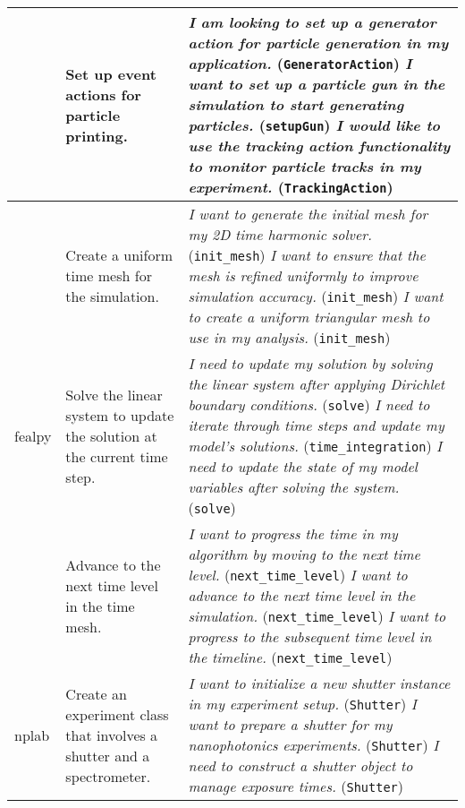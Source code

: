 \begin{longtable}{p{3cm}p{6cm}p{6cm}}
\cmidrule(l){2-3}
& Set up event actions for particle printing. & \textit{I am looking to set up a generator action for particle generation in my application.} (\texttt{GeneratorAction}) \newline \textit{I want to set up a particle gun in the simulation to start generating particles.} (\texttt{setupGun}) \newline \textit{I would like to use the tracking action functionality to monitor particle tracks in my experiment.} (\texttt{TrackingAction}) \\
\midrule
\multirow{3}{*}{fealpy} & Create a uniform time mesh for the simulation. & \textit{I want to generate the initial mesh for my 2D time harmonic solver.} (\texttt{init\_mesh}) \newline \textit{I want to ensure that the mesh is refined uniformly to improve simulation accuracy.} (\texttt{init\_mesh}) \newline \textit{I want to create a uniform triangular mesh to use in my analysis.} (\texttt{init\_mesh}) \\
\cmidrule(l){2-3}
& Solve the linear system to update the solution at the current time step. & \textit{I need to update my solution by solving the linear system after applying Dirichlet boundary conditions.} (\texttt{solve}) \newline \textit{I need to iterate through time steps and update my model's solutions.} (\texttt{time\_integration}) \newline \textit{I need to update the state of my model variables after solving the system.} (\texttt{solve}) \\
\cmidrule(l){2-3}
& Advance to the next time level in the time mesh. & \textit{I want to progress the time in my algorithm by moving to the next time level.} (\texttt{next\_time\_level}) \newline \textit{I want to advance to the next time level in the simulation.} (\texttt{next\_time\_level}) \newline \textit{I want to progress to the subsequent time level in the timeline.} (\texttt{next\_time\_level}) \\
\midrule
\multirow{3}{*}{nplab} & Create an experiment class that involves a shutter and a spectrometer. & \textit{I want to initialize a new shutter instance in my experiment setup.} (\texttt{Shutter}) \newline \textit{I want to prepare a shutter for my nanophotonics experiments.} (\texttt{Shutter}) \newline \textit{I need to construct a shutter object to manage exposure times.} (\texttt{Shutter}) \\

\end{longtable}
